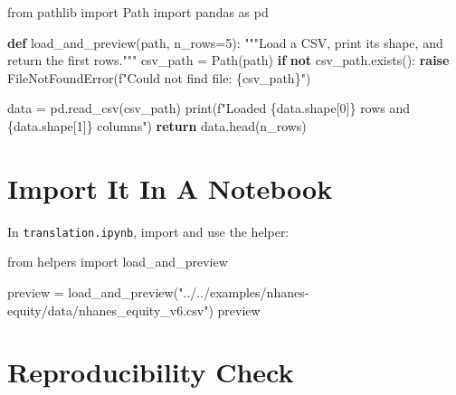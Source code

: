 \documentclass[
  letterpaper,
  DIV=11,
  numbers=noendperiod,
  oneside]{scrreprt}
\newenvironment{Shaded}{\begin{snugshade}}{\end{snugshade}}
\newcommand{\BuiltInTok}[1]{\textcolor[rgb]{0.00,0.23,0.31}{#1}}
\newcommand{\CommentTok}[1]{\textcolor[rgb]{0.37,0.37,0.37}{#1}}
\newcommand{\ControlFlowTok}[1]{\textcolor[rgb]{0.00,0.23,0.31}{\textbf{#1}}}
\newcommand{\DecValTok}[1]{\textcolor[rgb]{0.68,0.00,0.00}{#1}}
\newcommand{\ImportTok}[1]{\textcolor[rgb]{0.00,0.46,0.62}{#1}}
\newcommand{\KeywordTok}[1]{\textcolor[rgb]{0.00,0.23,0.31}{\textbf{#1}}}
\newcommand{\NormalTok}[1]{\textcolor[rgb]{0.00,0.23,0.31}{#1}}
\newcommand{\OperatorTok}[1]{\textcolor[rgb]{0.37,0.37,0.37}{#1}}
\newcommand{\PreprocessorTok}[1]{\textcolor[rgb]{0.68,0.00,0.00}{#1}}
\newcommand{\SpecialCharTok}[1]{\textcolor[rgb]{0.37,0.37,0.37}{#1}}
\newcommand{\SpecialStringTok}[1]{\textcolor[rgb]{0.13,0.47,0.30}{#1}}
\newcommand{\StringTok}[1]{\textcolor[rgb]{0.13,0.47,0.30}{#1}}
\begin{document}
\begin{Shaded}
\begin{Highlighting}[numbers=left,,]
\ImportTok{from}\NormalTok{ pathlib }\ImportTok{import}\NormalTok{ Path}
\ImportTok{import}\NormalTok{ pandas }\ImportTok{as}\NormalTok{ pd}


\KeywordTok{def}\NormalTok{ load\_and\_preview(path, n\_rows}\OperatorTok{=}\DecValTok{5}\NormalTok{):}
    \CommentTok{"""Load a CSV, print its shape, and return the first rows."""}
\NormalTok{    csv\_path }\OperatorTok{=}\NormalTok{ Path(path)}
    \ControlFlowTok{if} \KeywordTok{not}\NormalTok{ csv\_path.exists():}
        \ControlFlowTok{raise} \PreprocessorTok{FileNotFoundError}\NormalTok{(}\SpecialStringTok{f"Could not find file: }\SpecialCharTok{\{}\NormalTok{csv\_path}\SpecialCharTok{\}}\SpecialStringTok{"}\NormalTok{)}

\NormalTok{    data }\OperatorTok{=}\NormalTok{ pd.read\_csv(csv\_path)}
    \BuiltInTok{print}\NormalTok{(}\SpecialStringTok{f"Loaded }\SpecialCharTok{\{}\NormalTok{data}\SpecialCharTok{.}\NormalTok{shape[}\DecValTok{0}\NormalTok{]}\SpecialCharTok{\}}\SpecialStringTok{ rows and }\SpecialCharTok{\{}\NormalTok{data}\SpecialCharTok{.}\NormalTok{shape[}\DecValTok{1}\NormalTok{]}\SpecialCharTok{\}}\SpecialStringTok{ columns"}\NormalTok{)}
    \ControlFlowTok{return}\NormalTok{ data.head(n\_rows)}
\end{Highlighting}
\end{Shaded}

\section{Import It In A Notebook}\label{import-it-in-a-notebook}

In \texttt{translation.ipynb}, import and use the helper:

\begin{Shaded}
\begin{Highlighting}[numbers=left,,]
\ImportTok{from}\NormalTok{ helpers }\ImportTok{import}\NormalTok{ load\_and\_preview}

\NormalTok{preview }\OperatorTok{=}\NormalTok{ load\_and\_preview(}\StringTok{"../../examples/nhanes{-}equity/data/nhanes\_equity\_v6.csv"}\NormalTok{)}
\NormalTok{preview}
\end{Highlighting}
\end{Shaded}

\section{Reproducibility Check}\label{reproducibility-check-1}
\end{document}
